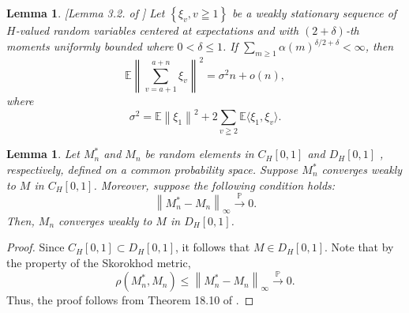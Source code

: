 \documentclass[11pt]{article}
\newcommand{\bE}{\mathbb{E}}
\newcommand{\bP}{\mathbb{P}}
\theoremstyle{plain}
\newtheorem{lemma}[theorem]{Lemma}
\theoremstyle{definition}
\theoremstyle{remark}
\begin{document}
\begin{appendix}
\begin{lemma}\label{lemma:dehling_3.2}[Lemma 3.2. of \cite{dehling1983limit}]
     Let $\left\{\xi_v, v \geqq 1\right\}$ be a weakly stationary sequence of $H$-valued random variables centered at expectations and with $(2+\delta)$-th moments uniformly bounded where $0<\delta \leq 1$. If \(\sum_{m\geq 1} \alpha(m)^{\delta/2+\delta}<\infty\), then
$$
\bE\left\|\sum_{v=a+1}^{a+n} \xi_v\right\|^2=\sigma^2 n+o(n),
$$
where
$$
\sigma^2=\bE\left\|\xi_1\right\|^2+2 \sum_{v \geqq 2} \bE\langle\xi_1, \xi_v\rangle.
$$
\end{lemma}
\begin{lemma}\label{lemma:asymp_negligble_process}
    Let $M_n^*$ and $M_n$ be random elements in $C_H[0,1]$ and $D_H[0,1]$ , respectively, defined on a common probability space. Suppose $M_n^*$ converges weakly to $M$ in $C_H[0,1]$. Moreover, suppose the following condition holds:
    \[\left\|M^*_n-M_n\right\|_{\infty}\overset{\bP}{\to}0.\]
    Then, $M_n$ converges weakly to $M$ in $D_H[0,1]$.
\end{lemma}
\begin{proof}
    Since $C_H[0,1]\subset D_H[0,1]$, it follows that $M\in D_H[0,1]$. Note that by the property of the Skorokhod metric,
    \[\rho(M^*_n,M_n)\leq \left\|M^*_n-M_n\right\|_{\infty}\overset{\bP}{\to}0.\]
    Thus, the proof follows from Theorem 18.10 of \cite{van2000asymptotic}.
\end{proof}
\end{appendix}
\end{document}
